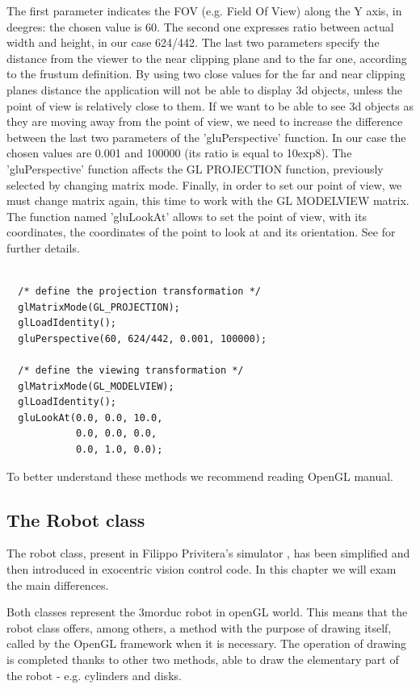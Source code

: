 The first parameter indicates the FOV (e.g. Field Of View) 
along the Y axis, in deegres: the chosen value is 60. The
second one expresses ratio between actual width and height, 
in our case 624/442. The last two parameters specify the distance 
from the viewer to the near clipping plane and to the far one, 
according to the frustum definition.
%
By using two close values for the far and near clipping planes 
distance the application will not be able to display 3d
objects, unless the point of view is relatively close to them. 
If we want to be able to see 3d objects as they are moving away
from the point of view, we need to increase the difference between 
the last two parameters of the 'gluPerspective' function. In
our case the chosen values are 0.001 and 100000 (its ratio is 
equal to 10exp8).
%
The 'gluPerspective' function affects the GL PROJECTION function, 
previously selected by changing matrix mode. Finally,
in order to set our point of view, we must change matrix again, 
this time to work with the GL MODELVIEW matrix. The function named
'gluLookAt' allows to set the point of view, with its coordinates, 
the coordinates of the point to look at and its orientation.
%
See \cite{opengl:gluLookAt} for further details.
%
\begin{lstlisting}[caption={OpenGL perspective example}, label={code:perspective}, frame=trBL]

  /* define the projection transformation */
  glMatrixMode(GL_PROJECTION);
  glLoadIdentity();
  gluPerspective(60, 624/442, 0.001, 100000);
  
  /* define the viewing transformation */
  glMatrixMode(GL_MODELVIEW);
  glLoadIdentity();
  gluLookAt(0.0, 0.0, 10.0,
            0.0, 0.0, 0.0,
            0.0, 1.0, 0.0);

\end{lstlisting}
%
To better understand these methods we recommend reading OpenGL manual.
%
\subsection{The Robot class}
The robot class, present in Filippo Privitera's simulator 
\cite{privitera}, has been simplified and then introduced in
exocentric vision control code. In this chapter we will 
exam the main differences.
%

%
Both classes represent the 3morduc robot in openGL world. 
This means that the robot class offers, among others, a
method with the purpose of drawing itself, called by the 
OpenGL framework when it is necessary. The operation of 
drawing is completed thanks to other two methods, able 
to draw the elementary part of the robot - e.g. cylinders and disks.
%

